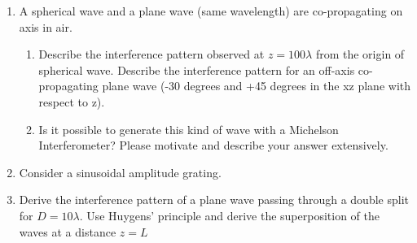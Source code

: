 \documentclass[main.tex]{subfiles}
\begin{document}
\begin{enumerate}
\item{A spherical wave and a plane wave (same wavelength) are co-propagating on axis in air.}
\begin{enumerate}
\item Describe the interference pattern observed at $z=100\lambda$ from the origin of spherical wave.
\itme Describe the interference pattern for an off-axis co-propagating plane wave (-30 degrees and +45 degrees in the xz plane with respect to z).
\item Is it possible to generate this kind of wave with a Michelson Interferometer? Please motivate and describe your answer extensively.
\end{enumerate}
\item{Consider a sinusoidal amplitude grating.}
\item{Derive the interference pattern of a plane wave passing through a double split for $D=10\lambda$. Use Huygens' principle and derive the superposition of the waves at a distance $z=L$}
\end{enumerate}
\end{document}
